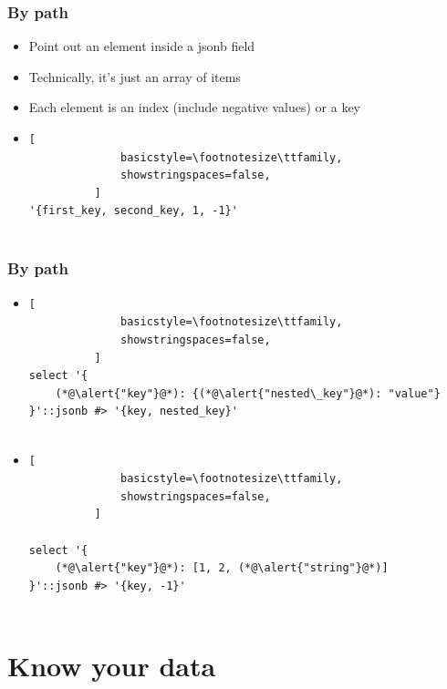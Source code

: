 \documentclass[14pt, compress]{beamer}
\begin{document}
\begin{frame}[fragile]
  \frametitle{By path}

  \begin{itemize}
      \item[\MVRightarrow] Point out an element inside a jsonb field
      \item[\MVRightarrow] Technically, it's just an array of items
      \item[\MVRightarrow] Each element is an index (include negative values) or a key
      \item
          \begin{lstlisting}[
              basicstyle=\footnotesize\ttfamily,
              showstringspaces=false,
          ]
'{first_key, second_key, 1, -1}'
         
          \end{lstlisting}

  \end{itemize}

\end{frame}

\begin{frame}[fragile]
  \frametitle{By path}

  \begin{itemize}
      \item
          \begin{lstlisting}[
              basicstyle=\footnotesize\ttfamily,
              showstringspaces=false,
          ]
select '{
    (*@\alert{"key"}@*): {(*@\alert{"nested\_key"}@*): "value"}
}'::jsonb #> '{key, nested_key}'
         
          \end{lstlisting}

      \item
          \begin{lstlisting}[
              basicstyle=\footnotesize\ttfamily,
              showstringspaces=false,
          ]

select '{
    (*@\alert{"key"}@*): [1, 2, (*@\alert{"string"}@*)]
}'::jsonb #> '{key, -1}'
         
          \end{lstlisting}

  \end{itemize}

\end{frame}

\section{Know your data}
\end{document}
